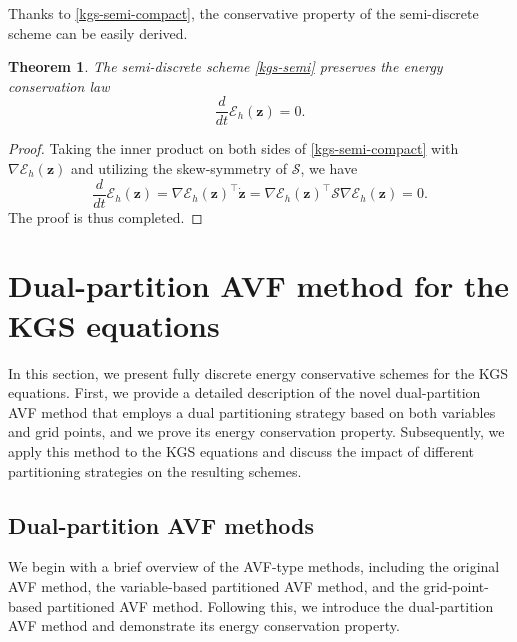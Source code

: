\documentclass[fleqn,11pt]{elsarticle}
\numberwithin{equation}{section}
\newtheorem{thm}{Theorem}[section]
\begin{document}
Thanks to \eqref{kgs-semi-compact}, the conservative property of the semi-discrete scheme can be easily derived.
\begin{thm}
	The semi-discrete scheme \eqref{kgs-semi} preserves the energy conservation law
	\begin{equation*}
		\frac{d}{dt} \mathcal{E}_h(\bm z) = 0.
	\end{equation*}
\end{thm}
\begin{proof}
	Taking the inner product on both sides of \eqref{kgs-semi-compact} with $\nabla \mathcal{E}_h(\bm z)$ and utilizing the skew-symmetry of $\mathcal{S}$, we have
	\begin{equation*}
		\frac{d}{dt} \mathcal{E}_h(\bm z) = \nabla \mathcal{E}_h(\bm z)^\top \dot{\bm z}  =  \nabla \mathcal{E}_h(\bm z)^\top \mathcal{S}\nabla \mathcal{E}_h(\bm z)  = 0.
	\end{equation*}
	The proof is thus completed.
\end{proof}

\section{Dual-partition AVF method for the KGS equations}\label{sec:3}


In this section, we present fully discrete energy conservative schemes for the KGS equations. First, we provide a detailed description of the novel dual-partition AVF method that employs a dual partitioning strategy based on both variables and grid points, and we prove its energy conservation property. Subsequently, we apply this method to the KGS equations and discuss the impact of different partitioning strategies on the resulting schemes.

\subsection{Dual-partition AVF methods}\label{subs:3.1}

We begin with a brief overview of the AVF-type methods, including the original AVF method, the variable-based partitioned AVF method, and the grid-point-based partitioned AVF method. Following this, we introduce the dual-partition AVF method and demonstrate its energy conservation property.
\end{document}
